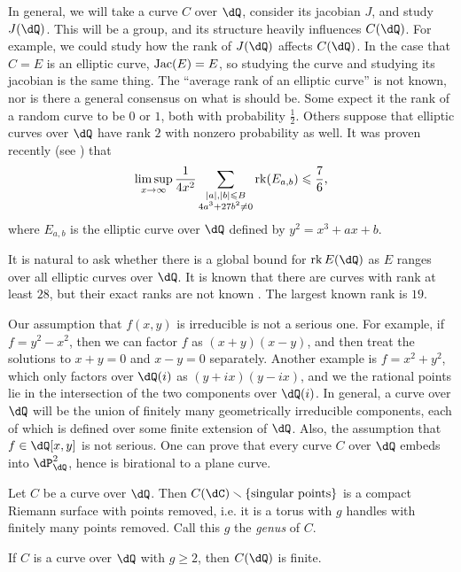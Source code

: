 \documentclass{article}
\begin{document}
In general, we will take a curve $C$ over $\dQ$, consider its jacobian $J$, and study 
$J(\dQ)$. This will be a group, and its structure heavily influences $C(\dQ)$. 
For example, we could study how the rank of $J(\dQ)$ affects $C(\dQ)$. In the 
case that $C=E$ is an elliptic curve, $\operatorname{Jac}(E)=E$, so studying the curve and 
studying its jacobian is the same thing. The ``average rank of an elliptic 
curve'' is not known, nor is there a general consensus on what is should be. 
Some expect it the rank of a random curve to be $0$ or $1$, both with 
probability $\frac 1 2$. Others suppose that elliptic curves over $\dQ$ have 
rank $2$ with nonzero probability as well. It was proven recently (see 
\cite[\S 1]{bh10}) that 
\[
  \limsup_{x\to\infty} \frac{1}{4 x^2} \sum_{\substack{|a|,|b|\leqslant B \\ 4 a^3+27 b^2\ne 0}} \operatorname{rk}(E_{a,b}) \leqslant\frac 7 6 \text{,}
\]
where $E_{a,b}$ is the elliptic curve over $\dQ$ defined by $y^2=x^3 +a x+b$.

It is natural to ask whether there is a global bound for $\rank E(\dQ)$ as 
$E$ ranges over all elliptic curves over $\dQ$. 
It is known that there are curves with rank at least $28$, but their exact 
ranks are not known \cite{du}. The largest known rank is $19$.  

Our assumption that $f(x,y)$ is irreducible is not a serious one. For example, 
if $f=y^2-x^2$, then we can factor $f$ as $(x+y)(x-y)$, and then treat the 
solutions to $x+y=0$ and $x-y=0$ separately. Another example is $f=x^2+y^2$, 
which only factors over $\dQ(i)$ as $(y+i x)(y-i x)$, and we the rational 
points lie in the intersection of the two components over $\dQ(i)$. In general, 
a curve over $\dQ$ will be the union of finitely many geometrically irreducible 
components, each of which is defined over some finite extension of $\dQ$. Also, 
the assumption that $f\in \dQ[x,y]$ is not serious. One can prove that every 
curve $C$ over $\dQ$ embeds into $\dP^2_\dQ$, hence is birational to a plane curve. 

Let $C$ be a curve over $\dQ$. Then 
$C(\dC)\smallsetminus \{\text{singular points}\}$ is a compact Riemann 
surface with points removed, i.e. it is a torus with $g$ handles with finitely 
many points removed. Call this $g$ the \emph{genus} of $C$. 

\begin{theorem}
If $C$ is a curve over $\dQ$ with $g\geqslant 2$, then $C(\dQ)$ 
is finite. 
\end{theorem}
\end{document}
